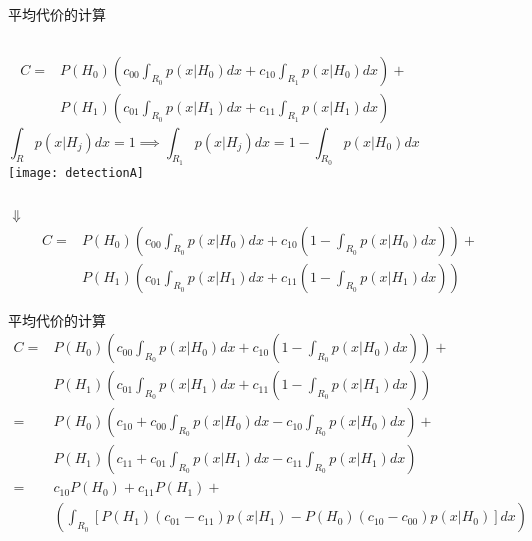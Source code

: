 \begin{frame}[shrink]{平均代价的计算}
\begin{columns}
	\begin{align*}
	C=&P(H_0)\left(c_{00}\int_{R_0}p(x|H_0)dx+c_{10}\int_{R_1}p(x|H_0)dx\right)+\\
	&P(H_1)\left(c_{01}\int_{R_0}p(x|H_1)dx+c_{11}\int_{R_1}p(x|H_1)dx\right)
	\end{align*}
	\[\int_{R}p(x|H_j)dx=1 \implies \int_{R_1}p(x|H_j)dx=1-\int_{R_0}p(x|H_0)dx \]
	\texttt{[image: detectionA]}
\end{columns}

\medskip
\centering $\Downarrow$
\begin{align*}
C=&P(H_0)\left(c_{00}\int_{R_0}p(x|H_0)dx+c_{10}\left(1-\int_{R_0}p(x|H_0)dx\right)\right)+\\
&P(H_1)\left(c_{01}\int_{R_0}p(x|H_1)dx+c_{11}\left(1-\int_{R_0}p(x|H_1)dx\right)\right)
\end{align*}
\end{frame}

\begin{frame}[shrink]{平均代价的计算}
\begin{align*}
C=&P(H_0)\left(c_{00}\int_{R_0}p(x|H_0)dx+c_{10}\left(1-\int_{R_0}p(x|H_0)dx\right)\right)+\\
&P(H_1)\left(c_{01}\int_{R_0}p(x|H_1)dx+c_{11}\left(1-\int_{R_0}p(x|H_1)dx\right)\right)\\
=&P(H_0)\left(c_{10}+c_{00}\int_{R_0}p(x|H_0)dx-c_{10}\int_{R_0}p(x|H_0)dx\right)+\\
&P(H_1)\left(c_{11}+c_{01}\int_{R_0}p(x|H_1)dx-c_{11}\int_{R_0}p(x|H_1)dx\right)\\
=&c_{10}P(H_0)+c_{11}P(H_1)+\\
&\left(\int_{R_0}\left[P({H_1})(c_{01}-c_{11})p(x|H_1)-P(H_0)(c_{10}-c_{00})p(x|H_0)\right]dx \right)
\end{align*}
\end{frame}

